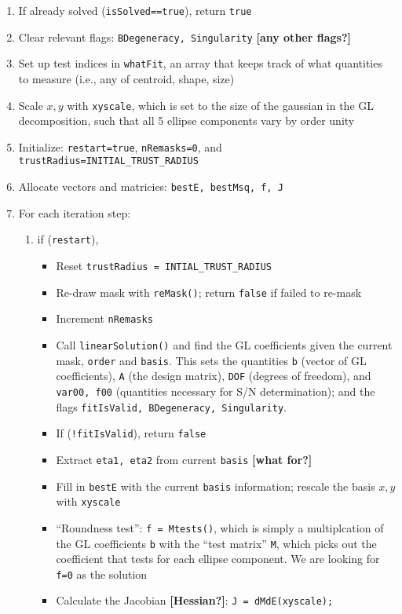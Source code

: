 \documentclass[useAMS,usenatbib,usegraphicx]{mn2e}
\begin{document}
\begin{enumerate}
\item If already solved ({\tt isSolved==true}), return {\tt true}
\item Clear relevant flags: {\tt BDegeneracy, Singularity} {\bf [any other flags?]}
\item Set up test indices in {\tt whatFit}, an array that keeps track of what quantities to 
measure (i.e., any of centroid, shape, size)
\item Scale $x,y$ with {\tt xyscale}, which is set to the size of the gaussian in the GL 
decomposition, such that all 5 ellipse components vary by order unity
\item Initialize: {\tt restart=true}, {\tt nRemasks=0}, and {\tt trustRadius=INITIAL\_TRUST\_RADIUS}
\item Allocate vectors and matricies: {\tt bestE, bestMsq, f, J}
\item For each iteration step:
\begin{enumerate}
  \item if ({\tt restart}),
  \begin{itemize}
    \item Reset {\tt trustRadius = INTIAL\_TRUST\_RADIUS}
    \item Re-draw mask with {\tt reMask()}; return {\tt false} if failed to re-mask
    \item Increment {\tt nRemasks}
    \item Call {\tt linearSolution()} and find the GL coefficients given the current mask, 
{\tt order} and {\tt basis}.  This sets the quantities {\tt b} (vector of GL coefficients),
{\tt A} (the design matrix), {\tt DOF} (degrees of freedom), and {\tt var00, f00} (quantities 
necessary for S/N determination); and the flags {\tt fitIsValid, BDegeneracy, Singularity}.
    \item If ({\tt !fitIsValid}), return {\tt false}
    \item Extract {\tt eta1, eta2} from current {\tt basis} {\bf [what for?]}
    \item Fill in {\tt bestE} with the current {\tt basis} information; 
rescale the basis $x,y$ with {\tt xyscale}
    \item ``Roundness test'': {\tt f = Mtests()}, which is simply a multiplcation of the GL 
coefficients {\tt b} with the ``test matrix'' {\tt M}, which picks out the coefficient that 
tests for each ellipse component.  We are looking for {\tt f=0} as the solution
    \item Calculate the Jacobian {\bf [Hessian?]}: {\tt J = dMdE(xyscale);}

\end{itemize}
\end{enumerate}
\end{enumerate}
\end{document}

